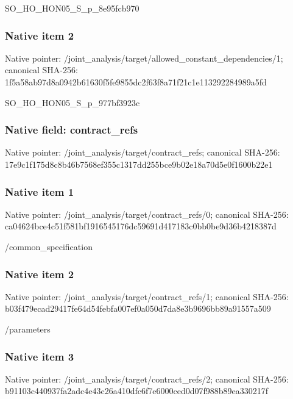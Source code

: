 \documentclass[10pt,a4paper]{article}
\begin{document}
\begingroup\raggedright\sloppy SO\_\allowbreak{}HO\_\allowbreak{}HON05\_\allowbreak{}S\_\allowbreak{}p\_\allowbreak{}8e95fcb970\par\endgroup

\subsubsection{Native item 2}
Native pointer: /joint\_\allowbreak{}analysis/target/allowed\_\allowbreak{}constant\_\allowbreak{}dependencies/1; canonical SHA-256: 1f5a58ab97d8a0942b61630f5fe9855dc2f63f8a71f21c1e113292284989a5fd

\begingroup\raggedright\sloppy SO\_\allowbreak{}HO\_\allowbreak{}HON05\_\allowbreak{}S\_\allowbreak{}p\_\allowbreak{}977bf3923c\par\endgroup

\subsubsection{Native field: contract\_\allowbreak{}refs}
Native pointer: /joint\_\allowbreak{}analysis/target/contract\_\allowbreak{}refs; canonical SHA-256: 17e9c1f175d8c8b46b7568ef355c1317dd255bce9b02e18a70d5e0f1600b22e1

\subsubsection{Native item 1}
Native pointer: /joint\_\allowbreak{}analysis/target/contract\_\allowbreak{}refs/0; canonical SHA-256: ca04624bce4c51f581bf1916545176dc59691d417183c0bb0be9d36b4218387d

\begingroup\raggedright\sloppy /\allowbreak{}common\_\allowbreak{}specification\par\endgroup

\subsubsection{Native item 2}
Native pointer: /joint\_\allowbreak{}analysis/target/contract\_\allowbreak{}refs/1; canonical SHA-256: b03f479ecad29417fe64d54febfa007ef0a050d7da8e3b9696bb89a91557a509

\begingroup\raggedright\sloppy /\allowbreak{}parameters\par\endgroup

\subsubsection{Native item 3}
Native pointer: /joint\_\allowbreak{}analysis/target/contract\_\allowbreak{}refs/2; canonical SHA-256: b91103c440937fa2adc4e43c26a410dfc6f7e6000ced0d07f988b89ea330217f
\end{document}
